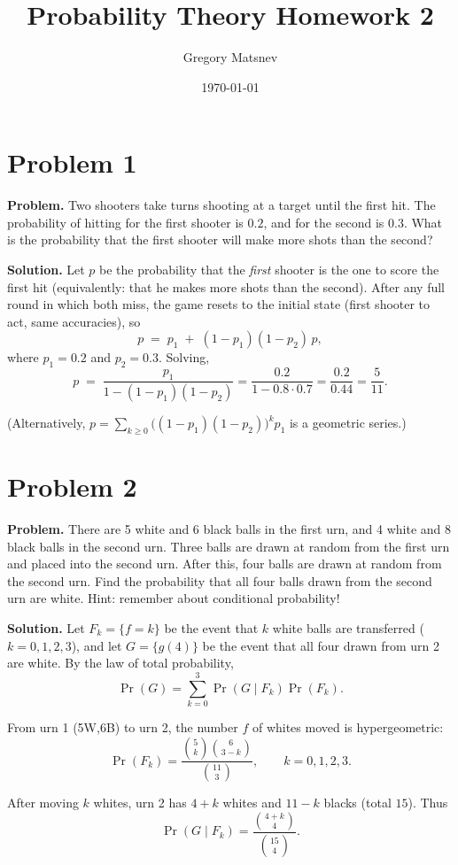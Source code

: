 \documentclass{article}
\title{Probability Theory Homework 2}
\author{Gregory Matsnev}
\date{\today}
\begin{document}
\maketitle

\section{Problem 1}

\textbf{Problem.} Two shooters take turns shooting at a target until the first hit. The probability of hitting for the first shooter is $0.2$, and for the second is $0.3$. What is the probability that the first shooter will make more shots than the second?

\textbf{Solution.}
Let $p$ be the probability that the \emph{first} shooter is the one to score the first hit (equivalently: that he makes more shots than the second). After any full round in which both miss, the game resets to the initial state (first shooter to act, same accuracies), so
\[
p \;=\; p_1 \;+\; (1-p_1)(1-p_2)\,p,
\]
where $p_1=0.2$ and $p_2=0.3$. Solving,
\[
p \;=\; \frac{p_1}{1-(1-p_1)(1-p_2)}
= \frac{0.2}{1-0.8\cdot0.7}
= \frac{0.2}{0.44}
= \frac{5}{11}.
\]

(Alternatively, \(p=\sum_{k\ge0}\bigl((1-p_1)(1-p_2)\bigr)^k p_1\) is a geometric series.)

\section{Problem 2}

\textbf{Problem.} There are 5 white and 6 black balls in the first urn, and 4 white and 8 black balls in the second urn. Three balls are drawn at random from the first urn and placed into the second urn. After this, four balls are drawn at random from the second urn. Find the probability that all four balls drawn from the second urn are white. Hint: remember about conditional probability!

\textbf{Solution.}
Let $F_k=\{f=k\}$ be the event that $k$ white balls are transferred ($k=0,1,2,3$),
and let $G=\{g(4)\}$ be the event that all four drawn from urn 2 are white.
By the law of total probability,
\[
\Pr(G)=\sum_{k=0}^3 \Pr(G\mid F_k)\Pr(F_k).
\]

From urn 1 (5W,6B) to urn 2, the number $f$ of whites moved is
hypergeometric:
\[
\Pr(F_k)=\frac{\binom{5}{k}\binom{6}{3-k}}{\binom{11}{3}},\qquad k=0,1,2,3.
\]

After moving $k$ whites, urn 2 has $4+k$ whites and $11-k$ blacks
(total $15$). Thus
\[
\Pr(G\mid F_k)=\frac{\binom{4+k}{4}}{\binom{15}{4}}.
\]
\end{document}

